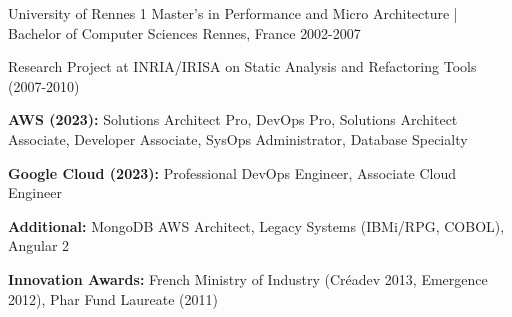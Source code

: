 \vspace{-1mm}

\begin{cventries}
\cventry
{University of Rennes 1} %
{Master's in Performance and Micro Architecture | Bachelor of Computer Sciences} %
{Rennes, France} %
{2002-2007} %
{
  \begin{cvitems}
    \item Research Project at INRIA/IRISA on Static Analysis and Refactoring Tools (2007-2010)
  \end{cvitems}
}
\end{cventries}

\vspace{-2mm}
\vspace{-1mm}
\begin{cvitems}
\item \textbf{AWS (2023):} Solutions Architect Pro, DevOps Pro, Solutions Architect Associate, Developer Associate, SysOps Administrator, Database Specialty
\item \textbf{Google Cloud (2023):} Professional DevOps Engineer, Associate Cloud Engineer
\item \textbf{Additional:} MongoDB AWS Architect, Legacy Systems (IBMi/RPG, COBOL), Angular 2
\end{cvitems}

\vspace{1mm}
\vspace{-1mm}
\begin{cvitems}
\item \textbf{Innovation Awards:} French Ministry of Industry (Créadev 2013, Emergence 2012), Phar Fund Laureate (2011)
\end{cvitems}
